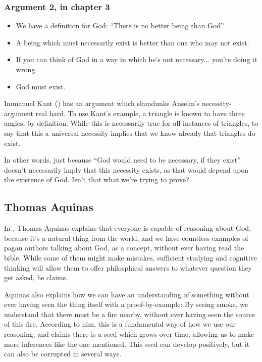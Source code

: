 \documentclass{article}
\begin{document}
	\subsubsection*{Argument 2, in chapter 3}
	\begin{itemize}
		\item We have a definition for God: ``There is no better being than God''.
		\item A being which must necessarily exist is better than one who may not exist.
		\item If you can think of God in a way in which he's not necessary... you're doing it wrong.
		\item God must exist.
	\end{itemize}

	Immanuel Kant (\citeyear{kant1781}) has an argument which slamdunks Anselm's necessity-argument real hard. To use Kant's example, a triangle is known to have three angles, by definition. While this is necessarily true for all instances of triangles, to say that this a universal necessity implies that we know already that triangles do exist.

	In other words, just because ``God would need to be necessary, if they exist'' doesn't necessarily imply that this necessity exists, as that would depend upon the existence of God. Isn't that what we're trying to prove?
	

	\subsection*{Thomas Aquinas}
	In \cite{aquinas1485}, Thomas Aquinas explains that everyone is capable of reasoning about God, because it's a natural thing from the world, and we have countless examples of pagan authors talking about God, as a concept, without ever having read the bible. While some of them might make mistakes, sufficient studying and cognitive thinking will allow them to offer philosphical answers to whatever question they get asked, he claims.

	Aquinas also explains how we can have an understanding of something without ever having seen the thing itself with a proof-by-example: By seeing smoke, we understand that there must be a fire nearby, without ever having seen the source of this fire. According to him, this is a fundamental way of how we use our reasoning, and claims there is a seed which grows over time, allowing us to make more inferences like the one mentioned. This seed can develop positively, but it can also be corrupted in several ways.
\end{document}
